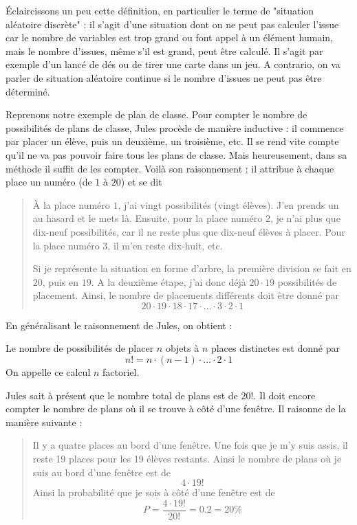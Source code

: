 Éclaircissons un peu cette définition, en particulier le terme de "situation aléatoire discrète" : il s'agit d'une situation dont on ne peut pas calculer l'issue car le nombre de variables est trop grand ou font appel à un élément humain, mais le nombre d'issues, même s'il est grand, peut être calculé. Il s'agit par exemple d'un lancé de dés ou de tirer une carte dans un jeu. A contrario, on va parler de situation aléatoire continue si le nombre d'issues ne peut pas être déterminé.

Reprenons notre exemple de plan de classe. Pour compter le nombre de possibilités de plans de classe, Jules procède de manière inductive : il commence par placer un élève, puis un deuxième, un troisième, etc. Il se rend vite compte qu'il ne va pas pouvoir faire tous les plans de classe. Mais heureusement, dans sa méthode il suffit de les compter. Voilà son raisonnement : il attribue à chaque place un numéro (de $1$ à $20$) et se dit 
\begin{quotation}
À la place numéro $1$, j'ai vingt possibilités (vingt élèves). J'en prends un au hasard et le mets là. Ensuite, pour la place numéro $2$, je n'ai plus que dix-neuf possibilités, car il ne reste plus que dix-neuf élèves à placer. Pour la place numéro $3$, il m'en reste dix-huit, etc.

Si je représente la situation en forme d'arbre, la première division se fait en $20$, puis en $19$. A la deuxième étape, j'ai donc déjà $20\cdot 19$ possibilités de placement. Ainsi, le nombre de placements différents doit être donné par 
$$
20\cdot 19\cdot 18\cdot 17 \cdot \dots \cdot 3 \cdot 2 \cdot 1 
$$
\end{quotation}

En généralisant le raisonnement de Jules, on obtient :

\begin{definition}
Le nombre de possibilités de placer $n$ objets à $n$ places distinctes est donné par 
$$
n! = n \cdot (n-1) \cdot \dots \cdot 2 \cdot 1
$$
On appelle ce calcul $n$ factoriel.
\end{definition}

Jules sait à présent que le nombre total de plans est de $20!$. Il doit encore compter le nombre de plans où il se trouve à côté d'une fenêtre. Il raisonne de la manière suivante :
\begin{quote}
Il y a quatre places au bord d'une fenêtre. Une fois que je m'y suis assis, il reste 19 places pour les 19 élèves restants. Ainsi le nombre de plans où je suis au bord d'une fenêtre est de 
$$
4 \cdot 19!
$$
Ainsi la probabilité que je sois à côté d'une fenêtre est de 
$$
P = \frac{4\cdot 19!}{20!} = 0.2 = 20 \%
$$
\end{quote}

